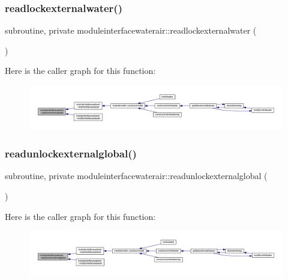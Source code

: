 \subsubsection{\texorpdfstring{readlockexternalwater()}{readlockexternalwater()}}
{\footnotesize\ttfamily subroutine, private moduleinterfacewaterair\+::readlockexternalwater (\begin{DoxyParamCaption}{ }\end{DoxyParamCaption})\hspace{0.3cm}{\ttfamily [private]}}

Here is the caller graph for this function\+:\nopagebreak
\begin{figure}[H]
\begin{center}
\leavevmode
\includegraphics[width=350pt]{namespacemoduleinterfacewaterair_a78276c71fe608663c6c964c59c8c7626_icgraph}
\end{center}
\end{figure}
\mbox{\label{namespacemoduleinterfacewaterair_ada112545191c798704451772d5803ea0}} 
\subsubsection{\texorpdfstring{readunlockexternalglobal()}{readunlockexternalglobal()}}
{\footnotesize\ttfamily subroutine, private moduleinterfacewaterair\+::readunlockexternalglobal (\begin{DoxyParamCaption}{ }\end{DoxyParamCaption})\hspace{0.3cm}{\ttfamily [private]}}

Here is the caller graph for this function\+:\nopagebreak
\begin{figure}[H]
\begin{center}
\leavevmode
\includegraphics[width=350pt]{namespacemoduleinterfacewaterair_ada112545191c798704451772d5803ea0_icgraph}
\end{center}
\end{figure}
\mbox{\label{namespacemoduleinterfacewaterair_a380a0dfa2a33b7c2eef433d69fdf7fef}} 
